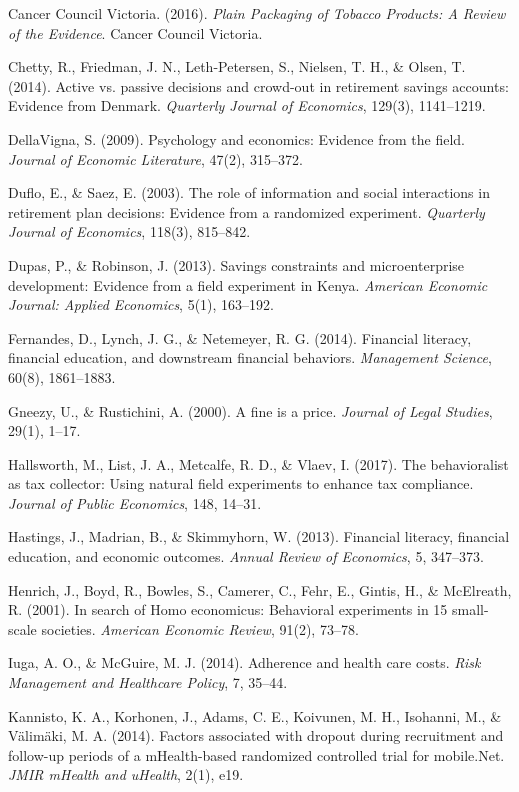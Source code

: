 \documentclass[12pt, letterpaper]{article}
\begin{document}
Cancer Council Victoria. (2016). \textit{Plain Packaging of Tobacco Products: A Review of the Evidence}. Cancer Council Victoria.

Chetty, R., Friedman, J. N., Leth-Petersen, S., Nielsen, T. H., \& Olsen, T. (2014). Active vs. passive decisions and crowd-out in retirement savings accounts: Evidence from Denmark. \textit{Quarterly Journal of Economics}, 129(3), 1141--1219.

DellaVigna, S. (2009). Psychology and economics: Evidence from the field. \textit{Journal of Economic Literature}, 47(2), 315--372.

Duflo, E., \& Saez, E. (2003). The role of information and social interactions in retirement plan decisions: Evidence from a randomized experiment. \textit{Quarterly Journal of Economics}, 118(3), 815--842.

Dupas, P., \& Robinson, J. (2013). Savings constraints and microenterprise development: Evidence from a field experiment in Kenya. \textit{American Economic Journal: Applied Economics}, 5(1), 163--192.

Fernandes, D., Lynch, J. G., \& Netemeyer, R. G. (2014). Financial literacy, financial education, and downstream financial behaviors. \textit{Management Science}, 60(8), 1861--1883.

Gneezy, U., \& Rustichini, A. (2000). A fine is a price. \textit{Journal of Legal Studies}, 29(1), 1--17.

Hallsworth, M., List, J. A., Metcalfe, R. D., \& Vlaev, I. (2017). The behavioralist as tax collector: Using natural field experiments to enhance tax compliance. \textit{Journal of Public Economics}, 148, 14--31.

Hastings, J., Madrian, B., \& Skimmyhorn, W. (2013). Financial literacy, financial education, and economic outcomes. \textit{Annual Review of Economics}, 5, 347--373.

Henrich, J., Boyd, R., Bowles, S., Camerer, C., Fehr, E., Gintis, H., \& McElreath, R. (2001). In search of Homo economicus: Behavioral experiments in 15 small-scale societies. \textit{American Economic Review}, 91(2), 73--78.

Iuga, A. O., \& McGuire, M. J. (2014). Adherence and health care costs. \textit{Risk Management and Healthcare Policy}, 7, 35--44.

Kannisto, K. A., Korhonen, J., Adams, C. E., Koivunen, M. H., Isohanni, M., \& Välimäki, M. A. (2014). Factors associated with dropout during recruitment and follow-up periods of a mHealth-based randomized controlled trial for mobile.Net. \textit{JMIR mHealth and uHealth}, 2(1), e19.
\end{document}
